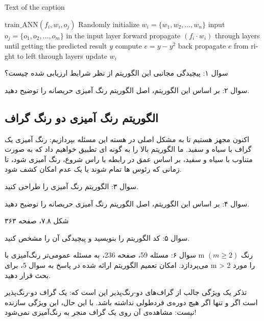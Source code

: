 \documentclass{book} %
\begin{document}
\begin{latin}
    
    \begin{algorithm}
        \caption{Text of the caption}\label{your_label}
        \begin{algorithmic}
            \STATE  $\mathrm{train\_ANN} (f_i,w_i,o_j)$
                \STATE Randomly initialize $w_i=\{w_1,w_2,\dots,w_n\}$
                \STATE input $o_j=\{o_1,o_2,\dots,o_m\}$ in the input layer
                \STATE forward propagate $(f_i\cdot w_i)$ through layers until getting the predicted result $y$
                \STATE compute $e=y-y^2$
                \STATE back propagate $e$ from right to left through layers
                \STATE update $w_i$
                \ENDWHILE
                \ENDFOR
            \end{algorithmic}
        \end{algorithm}
        
\end{latin}
سوال ۱: پیچیدگی مجانبی این الگوریتم از نظر شرایط ارزیابی شده چیست؟

سوال ۲: بر اساس این الگوریتم، اصل الگوریتم رنگ آمیزی حریصانه را توضیح دهید.

\subsection*{الگوریتم رنگ آمیزی دو رنگ گراف}

اکنون مجهز هستیم تا به مشکل اصلی در هسته این مسئله بپردازیم: رنگ آمیزی یک گراف با سیاه و سفید. ما الگوریتم بالا را به گونه ای تطبیق خواهیم داد که به صورت متناوب با سیاه و سفید، بر اساس عمق در رابطه با راس شروع، رنگ آمیزی شود، تا زمانی که رئوس ها تمام شوند یا یک عدم امکان کشف شود.

سوال ۳: الگوریتم رنگ آمیزی را طراحی کنید.

سوال ۴: بر اساس این الگوریتم، اصل الگوریتم رنگ آمیزی حریصانه را توضیح دهید.

شکل ۷.۸، صفحه ۳۶۳

سوال ۵: کد الگوریتم را بنویسید و پیچیدگی آن را مشخص کنید.

سوال ۶: مسئله 59، صفحه 236، به مسئله عمومی‌تر رنگ‌آمیزی با m رنگ $(m ≥ 2)$ می‌پردازد.
امکان تعمیم الگوریتم ارائه شده در پاسخ به سوال 5، برای m > 2 را مورد بحث قرار دهید.

تذکر
یک ویژگی جالب از گراف‌های دو-رنگ‌پذیر این است که: یک گراف دو-رنگ‌پذیر است اگر و تنها اگر هیچ دوره‌ی فردطولی نداشته باشد. با این حال، این ویژگی سازنده نیست: مشاهده‌ی آن روی یک گراف منجر به رنگ‌آمیزی نمی‌شود!
\end{document}
